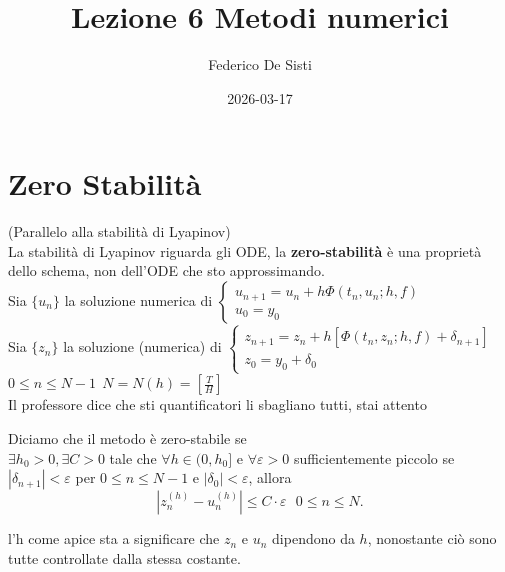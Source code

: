 \documentclass[12px]{article}
\title{Lezione 6 Metodi numerici}
\date{2026-03-17}
\author{Federico De Sisti}
\begin{document}
	\maketitle
	\newpage
	\section{Zero Stabilità }
	(Parallelo alla stabilità di Lyapinov)\\
	La stabilità di Lyapinov riguarda gli ODE, la \textbf{zero-stabilità} è una proprietà dello schema, non dell'ODE che sto approssimando.\\

	Sia $\{u_n\}$ la soluzione numerica di  $ \begin{cases}
		u_{n+1} = u_n + h\Phi(t_n,u_n; h, f)\\
		 u_0 = y_0
	\end{cases}$\\
	
	Sia $\{z_n\}$ la soluzione (numerica) di  $ \begin{cases}
		z_{n+1} = z_n + h[ \Phi(t_n,z_n;h,f) + \delta_{n+1}]\\
		z_0 = y_0 + \delta_0

	\end{cases}$
	$0\leq n\leq N-1 \ \ N = N(h) = [\frac T H]$\\
	Il professore dice che sti quantificatori li sbagliano tutti, stai attento
	 \begin{defi}
		Diciamo che il metodo è zero-stabile se\\
		$\exists h_0 > 0, \exists C>0$ tale che $\forall h \in (0,h_0]$ e $\forall \varepsilon > 0 $ sufficientemente piccolo se  $|\delta_{n+1}| < \varepsilon$  per  $0\leq n \leq N-1$ e  $|\delta_0| < \varepsilon$, allora
		\[
			|z_n^{(h)}-u_n^{(h)}|\leq C\cdot \varepsilon \ \ \ 0\leq n\leq N
		.\] 
	\end{defi}
	l'h come apice sta a significare che $z_n$ e $u_n$ dipendono da $h$, nonostante ciò sono tutte controllate dalla stessa costante.
\end{document}
